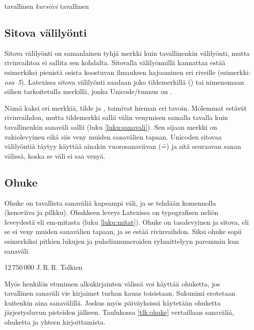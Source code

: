 \begin{tulossis}
  tavallinen {\itshape kursiivi} tavallinen
\end{tulossis}

\subsection{Sitova välilyönti}

Sitova välilyönti on samanlainen tyhjä merkki kuin tavallinenkin
välilyönti, mutta rivinvaihtoa ei sallita sen kohdalta. Sitovalla
välilyönnillä kannattaa estää esimerkiksi pienistä osista koostuvan
ilmauksen hajoaminen eri riveille (esimerkki: \emph{osa~5}). Latexissa
sitova välilyönti saadaan joko tildemerkillä (\koodi{\textasciitilde})
tai nimenomaan siihen tarkoitetulla merkillä, jonka Unicode\-/tunnus on
.

Nämä kaksi eri merkkiä, tilde ja , toimivat hieman eri
tavoin. Molemmat estävät rivinvaihdon, mutta tildemerkki sallii välin
venymisen samalla tavalla kuin tavallinenkin sanaväli sallii (luku
\ref{luku:sanavali}). Sen sijaan merkki  on
vakiolevyinen eikä siis veny muiden sanavälien tapaan. Unicoden sitovaa
välilyöntiä  täytyy käyttää ainakin vuorosanaviivan
(\==) ja sitä seuraavan sanan välissä, koska se väli ei saa venyä.

\subsection{Ohuke}
\label{luku:ohuke}

Ohuke on tavallista sanaväliä kapeampi väli, ja se tehdään
komennolla~\koodi{\keno,} (kenoviiva ja pilkku). Ohukkeen leveys
Latexissa on  typografisen neliön leveydestä eli
em-mitasta (luku \ref{luku:mitat}). Ohuke on tasalevyinen ja sitova, eli
se ei veny muiden sanavälien tapaan, ja se estää rivinvaihdon. Siksi
ohuke sopii esimerkiksi pitkien lukujen ja puhelinnumeroiden
ryhmittelyyn paremmin kun sanaväli.

\begin{koodilohkosis}
  12\,750\,000
  J.\,R.\,R. Tolkien
\end{koodilohkosis}

Myös henkilön etunimen alkukirjainten välissä voi käyttää ohuketta, jos
tavallinen sanaväli vie kirjaimet turhan kauas toisistaan. Sukunimi
erotetaan kuitenkin aina sanavälillä. Joskus myös päiväyksissä käytetään
ohuketta järjestysluvun pisteiden jälkeen. Taulukossa \ref{tlk:ohuke}
vertaillaan sanaväliä, ohuketta ja yhteen kirjoittamista.

